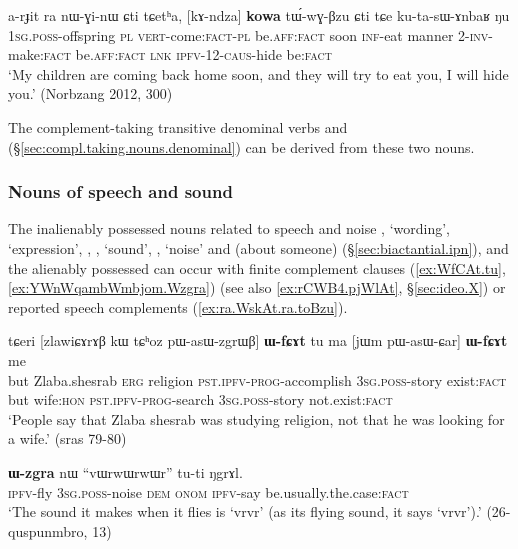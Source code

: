  \begin{exe}
\ex \label{ex:kAndza.kowa.tuwGBzu}
\gll  a-rɟit ra nɯ-ɣi-nɯ ɕti tɕetʰa, [kɤ-ndza] \textbf{kowa} tɯ́-wɣ-βzu ɕti tɕe ku-ta-sɯ-ɤnbaʁ ŋu \\
\textsc{1sg}.\textsc{poss}-offspring \textsc{pl} \textsc{vert}-come:\textsc{fact}-\textsc{pl} be.\textsc{aff}:\textsc{fact} soon \textsc{inf}-eat manner 2-\textsc{inv}-make:\textsc{fact} be.\textsc{aff}:\textsc{fact} \textsc{lnk} \textsc{ipfv}-1\fl{}2-\textsc{caus}-hide be:\textsc{fact} \\
\glt `My children are coming back home soon, and they will try to eat you, I will hide you.' (Norbzang 2012, 300)
\end{exe}

The complement-taking transitive denominal verbs  and  (§\ref{sec:compl.taking.nouns.denominal}) can be derived from these two nouns.
 
\subsubsection{Nouns of speech and sound} \label{sec:nouns.speech.complement}
The inalienably possessed nouns related to speech and noise , `wording', `expression', , , `sound', , `noise' and  (about someone) (§\ref{sec:biactantial.ipn}), and the alienably possessed  can occur with finite complement clauses (\ref{ex:WfCAt.tu}, \ref{ex:YWnWqambWmbjom.Wzgra}) (see also \ref{ex:rCWB4.pjWlAt}, §\ref{sec:ideo.X}) or reported speech complements (\ref{ex:ra.WskAt.ra.toBzu}).

\begin{exe}
   \ex  \label{ex:WfCAt.tu}
\gll  tɕeri [zlawiɕɤrɤβ kɯ tɕʰoz pɯ-asɯ-zgrɯβ] \textbf{ɯ-fɕɤt} tu ma [jɯm pɯ-asɯ-ɕar] \textbf{ɯ-fɕɤt} me \\
 but Zlaba.shesrab \textsc{erg} religion \textsc{pst}.\textsc{ipfv}-\textsc{prog}-accomplish  \textsc{3sg}.\textsc{poss}-story
exist:\textsc{fact} but wife:\textsc{hon} \textsc{pst}.\textsc{ipfv}-\textsc{prog}-search  \textsc{3sg}.\textsc{poss}-story not.exist:\textsc{fact} \\
\glt `People say that Zlaba shesrab was studying religion, not that he was looking for a wife.'  (sras 79-80)
\end{exe}

\begin{exe}
   \ex  \label{ex:YWnWqambWmbjom.Wzgra}
\gll [ɲɯ-nɯqambɯmbjom] \textbf{ɯ-zgra} nɯ ``vɯrwɯrwɯr'' tu-ti ŋgrɤl. \\
\textsc{ipfv}-fly \textsc{3sg}.\textsc{poss}-noise \textsc{dem} \textsc{onom} \textsc{ipfv}-say be.usually.the.case:\textsc{fact} \\
\glt `The sound it makes when it flies is `vrvr' (as its flying sound, it says `vrvr').' (26-quspunmbro, 13)
\end{exe}
 

